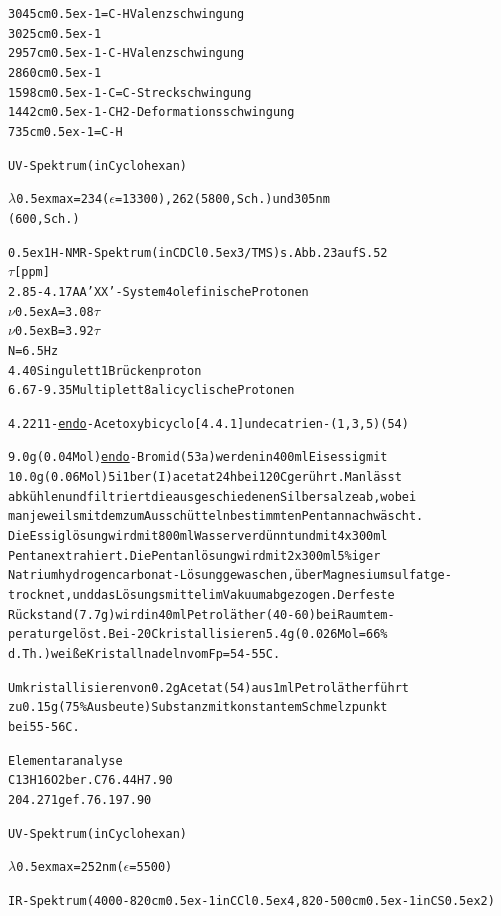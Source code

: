 \documentclass[a4paper,11pt]{article}
\begin{document}
\begin{alltt}

3045 cm\raise0.5ex\hbox{-1} =C-H Valenzschwingung
3025 cm\raise0.5ex\hbox{-1}
2957 cm\raise0.5ex\hbox{-1} -C-H Valenzschwingung
2860 cm\raise0.5ex\hbox{-1}
1598 cm\raise0.5ex\hbox{-1} -C=C- Streckschwingung
1442 cm\raise0.5ex\hbox{-1} -CH2- Deformationsschwingung
 735 cm\raise0.5ex\hbox{-1} =C-H


UV-Spektrum (in Cyclohexan)

\(\lambda\)\lower0.5ex\hbox{max} = 234 (\(\epsilon\) = 13300), 262 (5800, Sch.) und 305 nm
     (600, Sch.)


\newpage
{}


\leavevmode\raise0.5ex\hbox{1}H-NMR-Spektrum (in CDCl\lower0.5ex\hbox{3}/TMS) s. Abb. 23 auf S. 52
  \(\tau\) [ppm]
2.85 - 4.17  AA'XX'-System      4 olefinische Protonen
             \(\nu\)\lower0.5ex\hbox{A} = 3.08\(\tau\)
             \(\nu\)\lower0.5ex\hbox{B} = 3.92\(\tau\)
             N = 6.5 Hz
4.40         Singulett          1 Brückenproton
6.67 - 9.35  Multiplett         8 alicyclische Protonen


4.22 11-\underline{endo}-Acetoxybicyclo[4.4.1]undecatrien-(1‚3,5) (54)

9.0 g (0.04 Mol) \underline{endo}-Bromid (53a) werden in 400 ml Eisessig mit
10.0 g (0.06 Mol) 5i1ber(I)acetat 24 h bei 120\degree{}C gerührt. Man lässt
abkühlen und filtriert die ausgeschiedenen Silbersalze ab, wobei
man jeweils mit dem zum Ausschütteln bestimmten Pentan nachwäscht.
Die Essiglösung wird mit 800 ml Wasser verdünnt und mit 4 x 300 ml
Pentan extrahiert. Die Pentanlösung wird mit 2 x 300 ml 5 \%iger
Natriumhydrogencarbonat-Lösung gewaschen, über Magnesiumsulfat ge-
trocknet, und das Lösungsmittel im Vakuum abgezogen. Der feste
Rückstand (7.7 g) wird in 40 ml Petroläther (40-60) bei Raumtem-
peratur gelöst. Bei -20\degree{}C kristallisieren 5.4 g (0.026 Mol = 66 \%
d.Th.) weiße Kristallnadeln vom Fp = 54 - 55\degree{}C.

Umkristallisieren von 0.2 g Acetat (54) aus 1 ml Petroläther führt
zu 0.15 g (75 \% Ausbeute) Substanz mit konstantem Schmelzpunkt
bei 55 - 56\degree{}C.

Elementaranalyse
C13H16O2  ber.  C 76.44 H 7.90
204.271   gef.    76.19   7.90

UV-Spektrum (in Cyclohexan)

\(\lambda\)\lower0.5ex\hbox{max} = 252 nm (\(\epsilon\) = 5500)

\newpage
{}


IR-Spektrum (4000-820 cm\raise0.5ex\hbox{-1} in CCl\lower0.5ex\hbox{4}, 820-500 cm\raise0.5ex\hbox{-1} in CS\lower0.5ex\hbox{2})
\end{alltt}
\end{document}
